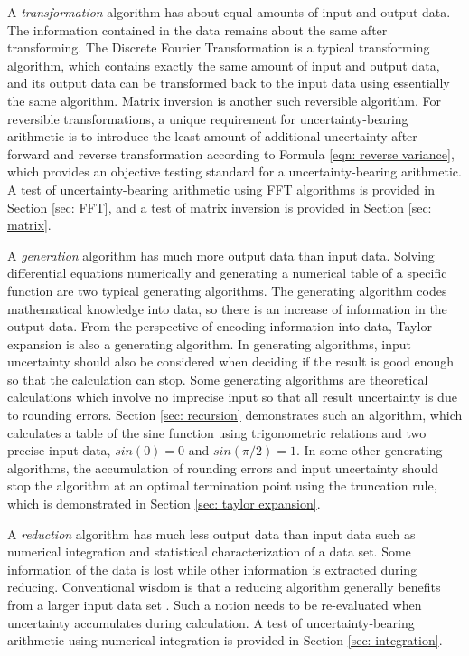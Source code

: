 \documentclass[twoside]{article}
\numberwithin{equation}{section}
\begin{document}
A \emph{transformation} algorithm has about equal amounts of input and output data.  
The information contained in the data remains about the same after transforming.  
The Discrete Fourier Transformation is a typical transforming algorithm, which contains exactly the same amount of input and output data, and its output data can be transformed back to the input data using essentially the same algorithm.  
Matrix inversion is another such reversible algorithm.  
For reversible transformations, a unique requirement for uncertainty-bearing arithmetic is to introduce the least amount of additional uncertainty after forward and reverse transformation according to Formula \eqref{eqn: reverse variance}, which provides an objective testing standard for a uncertainty-bearing arithmetic.  
A test of uncertainty-bearing arithmetic using FFT algorithms is provided in Section \ref{sec: FFT}, and a test of matrix inversion is provided in Section \ref{sec: matrix}.

A \emph{generation} algorithm has much more output data than input data.  
Solving differential equations numerically and generating a numerical table of a specific function are two typical generating algorithms.  
The generating algorithm codes mathematical knowledge into data, so there is an increase of information in the output data.  
From the perspective of encoding information into data, Taylor expansion is also a generating algorithm. 
In generating algorithms, input uncertainty should also be considered when deciding if the result is good enough so that the calculation can stop.  
Some generating algorithms are theoretical calculations which involve no imprecise input so that all result uncertainty is due to rounding errors.  
Section \ref{sec: recursion} demonstrates such an algorithm, which calculates a table of the sine function using trigonometric relations and two precise input data, $sin(0)=0$ and $sin(\pi/2)=1$.  
In some other generating algorithms, the accumulation of rounding errors and input uncertainty should stop the algorithm at an optimal termination point using the truncation rule, which is demonstrated in Section \ref{sec: taylor expansion}.

A \emph{reduction} algorithm has much less output data than input data such as numerical integration and statistical characterization of a data set.  
Some information of the data is lost while other information is extracted during reducing.  
Conventional wisdom is that a reducing algorithm generally benefits from a larger input data set \cite{Probability_Statistics}.  
Such a notion needs to be re-evaluated when uncertainty accumulates during calculation.  
A test of uncertainty-bearing arithmetic using numerical integration is provided in Section \ref{sec: integration}.
\end{document}
